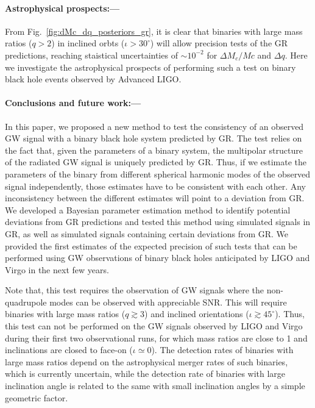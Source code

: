 \documentclass[prl,preprintnumbers,twocolumn,eqsecnum,floatfix,a4paper,nofootinbib,superscriptaddress]{revtex4}
\newcommand{\red}[1]{\textcolor{red}{#1}}
\begin{document}
% 

\paragraph{Astrophysical prospects:---} From Fig.~\ref{fig:dMc_dq_posteriors_gr}, it is clear that binaries with large mass ratios ($q > 2$) in inclined orbts ($\iota > 30 ^\circ $) will allow precision tests of the GR predictions, reaching staistical uncertainties of $\sim 10^{-2}$ for $\Delta M_c/Mc$ and $\Delta q$.   Here we investigate the astrophysical prospects of performing such a test on binary black hole events observed by Advanced LIGO. 

\paragraph{Conclusions and future work:---} In this paper, we proposed a new method to test the consistency of an observed GW signal with a binary black hole system predicted by GR. The test relies on the fact that, given the parameters of a binary system, the multipolar structure of the radiated GW signal is uniquely predicted by GR. Thus, if we estimate the parameters of the binary from different spherical harmonic modes of the observed signal independently, those estimates have to be consistent with each other. Any inconsistency between the different estimates will point to a deviation from GR. We developed a Bayesian parameter estimation method to identify potential deviations from GR predictions and tested this method using simulated signals in GR, as well as simulated signals containing certain deviations from GR.  We provided the first estimates of the expected precision of such tests that can be performed using GW observations of binary black holes anticipated by LIGO and Virgo in the next few years. 

Note that, this test requires the observation of GW signals where the non-quadrupole modes can be observed with appreciable SNR. This will require binaries with large mass ratios ($q \gtrsim 3$) and inclined orientations ($\iota \gtrsim 45^{\circ}$). Thus, this test can not be performed on the GW signals observed by LIGO and Virgo during their first two observational runs, for which mass ratios are close to 1 and inclinations are closed to face-on ($\iota \simeq 0$). The detection rates of binaries with large mass ratios depend on the astrophysical merger rates of such binaries, which is currently uncertain, while the detection rate of binaries with large inclination angle is related to the same with small inclination angles by a simple geometric factor. 
\end{document}
